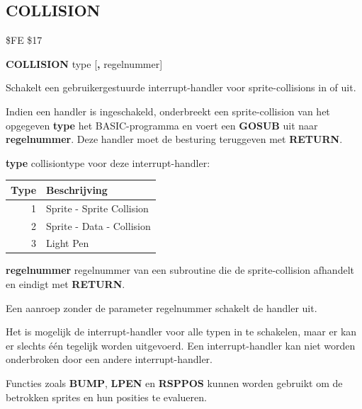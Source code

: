 \subsection{COLLISION}
\begin{description}[leftmargin=2cm,style=nextline]
\item [Token:]   \$FE \$17

\item [Formaat:]  {\bf COLLISION} type [{\bf,} regelnummer]

\item [Gebruik:]   Schakelt een gebruikergestuurde interrupt-handler voor sprite-collisions in of uit.

                 Indien een handler is ingeschakeld, onderbreekt een sprite-collision van het opgegeven {\bf type} het BASIC-programma en voert een {\bf GOSUB} uit naar {\bf regelnummer}. Deze handler moet de besturing teruggeven met {\bf RETURN}.

                 {\bf type} collisiontype voor deze interrupt-handler:
                 \begin{center}
                 \begin{tabular}{|r|l|}
                 \hline
                 {\bf Type} & {\bf Beschrijving}\\
                 \hline
                 1	& 	Sprite - Sprite Collision \\                 2	& 	Sprite - Data - Collision \\                 3	& 	Light Pen \\
                 \hline
                 \end{tabular}
                 \end{center}

                 {\bf regelnummer} regelnummer van een subroutine die de sprite-collision afhandelt en eindigt met {\bf RETURN}.

                 Een aanroep zonder de parameter regelnummer schakelt de handler uit.

\item [Opmerkingen:] Het is mogelijk de interrupt-handler voor alle typen in te schakelen, maar er kan er slechts één tegelijk worden uitgevoerd. Een interrupt-handler kan niet worden onderbroken door een andere interrupt-handler.

                 Functies zoals {\bf BUMP}, {\bf LPEN} en {\bf RSPPOS} kunnen worden gebruikt om de betrokken sprites en hun posities te evalueren.


\end{description}
